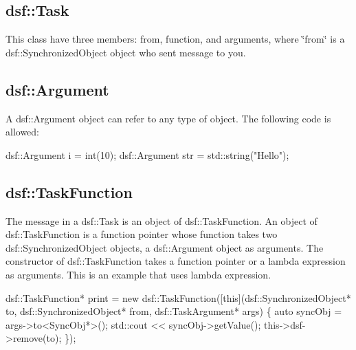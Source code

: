 \hypertarget{_framework_design_FrameworkDesignInterfacedsfTask}{}\subsection{dsf\+::\+Task}\label{_framework_design_FrameworkDesignInterfacedsfTask}
This class have three members\+: from, function, and arguments, where \char`\"{}from\char`\"{} is a dsf\+::\+Synchronized\+Object object who sent message to you.\hypertarget{_framework_design_FrameworkDesignInterfacedsfArgument}{}\subsection{dsf\+::\+Argument}\label{_framework_design_FrameworkDesignInterfacedsfArgument}
A dsf\+::\+Argument object can refer to any type of object. The following code is allowed\+: 
\begin{DoxyCode}
dsf::Argument i = int(10);
dsf::Argument str = std::string(\textcolor{stringliteral}{"Hello"});
\end{DoxyCode}
\hypertarget{_framework_design_FrameworkDesignInterfacedsfTaskFunction}{}\subsection{dsf\+::\+Task\+Function}\label{_framework_design_FrameworkDesignInterfacedsfTaskFunction}
The message in a dsf\+::\+Task is an object of dsf\+::\+Task\+Function. An object of dsf\+::\+Task\+Function is a function pointer whose function takes two dsf\+::\+Synchronized\+Object objects, a dsf\+::\+Argument object as arguments. The constructor of dsf\+::\+Task\+Function takes a function pointer or a lambda expression as arguments. This is an example that uses lambda expression. 
\begin{DoxyCode}
dsf::TaskFunction* print = \textcolor{keyword}{new} dsf::TaskFunction([\textcolor{keyword}{this}](dsf::SynchronizedObject* to, 
                                                        dsf::SynchronizedObject* from,
                                                        dsf::TaskArgument* args)
                                                \{
                                                    \textcolor{keyword}{auto} syncObj = args->to<SyncObj*>();
                                                    std::cout << syncObj->getValue();
                                                    this->dsf->remove(to);
                                                \});
\end{DoxyCode}
